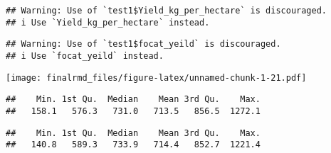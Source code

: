 \documentclass[
]{article}
\newenvironment{Shaded}{\begin{snugshade}}{\end{snugshade}}
\newcommand{\CommentTok}[1]{\textcolor[rgb]{0.56,0.35,0.01}{\textit{#1}}}
\newcommand{\FunctionTok}[1]{\textcolor[rgb]{0.13,0.29,0.53}{\textbf{#1}}}
\newcommand{\NormalTok}[1]{#1}
\newcommand{\SpecialCharTok}[1]{\textcolor[rgb]{0.81,0.36,0.00}{\textbf{#1}}}
\begin{document}
\begin{verbatim}
## Warning: Use of `test1$Yield_kg_per_hectare` is discouraged.
## i Use `Yield_kg_per_hectare` instead.
\end{verbatim}

\begin{verbatim}
## Warning: Use of `test1$focat_yeild` is discouraged.
## i Use `focat_yeild` instead.
\end{verbatim}

\texttt{[image: finalrmd\_files/figure-latex/unnamed-chunk-1-21.pdf]}

\begin{Shaded}
\end{Shaded}

\begin{verbatim}
##    Min. 1st Qu.  Median    Mean 3rd Qu.    Max. 
##   158.1   576.3   731.0   713.5   856.5  1272.1
\end{verbatim}

\begin{Shaded}
\end{Shaded}

\begin{verbatim}
##    Min. 1st Qu.  Median    Mean 3rd Qu.    Max. 
##   140.8   589.3   733.9   714.4   852.7  1221.4
\end{verbatim}
\end{document}
